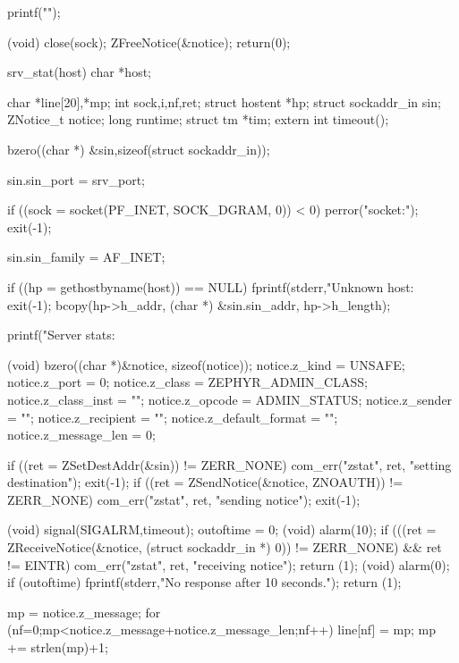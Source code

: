\begin{code}
{        printf("\n");
        
        (void) close(sock);
        ZFreeNotice(&notice);
        return(0);
}

srv_stat(host)
        char *host;
{
        char *line[20],*mp;
        int sock,i,nf,ret;
        struct hostent *hp;
        struct sockaddr_in sin;
        ZNotice_t notice;
        long runtime;
        struct tm *tim;
        extern int timeout();
        
        bzero((char *) &sin,sizeof(struct sockaddr_in));

        sin.sin_port = srv_port;

        if ((sock = socket(PF_INET, SOCK_DGRAM, 0)) < 0) {
                perror("socket:");
                exit(-1);
        }
        
        sin.sin_family = AF_INET;

        if ((hp = gethostbyname(host)) == NULL) {
                fprintf(stderr,"Unknown host: %
                exit(-1);
        }
        bcopy(hp->h_addr, (char *) &sin.sin_addr, hp->h_length);

        printf("Server stats: %
        
        (void) bzero((char *)&notice, sizeof(notice));
        notice.z_kind = UNSAFE;
        notice.z_port = 0;
        notice.z_class = ZEPHYR_ADMIN_CLASS;
        notice.z_class_inst = "";
        notice.z_opcode = ADMIN_STATUS;
        notice.z_sender = "";
        notice.z_recipient = "";
        notice.z_default_format = "";
        notice.z_message_len = 0;
        
        if ((ret = ZSetDestAddr(&sin)) != ZERR_NONE) {
                com_err("zstat", ret, "setting destination");
                exit(-1);
        }
        if ((ret = ZSendNotice(&notice, ZNOAUTH)) != ZERR_NONE) {
                com_err("zstat", ret, "sending notice");
                exit(-1);
        }

        (void) signal(SIGALRM,timeout);
        outoftime = 0;
        (void) alarm(10);
        if (((ret = ZReceiveNotice(&notice, (struct sockaddr_in *) 0))
            != ZERR_NONE) &&
            ret != EINTR) {
                com_err("zstat", ret, "receiving notice");
                return (1);
        }
        (void) alarm(0);
        if (outoftime) {
                fprintf(stderr,"No response after 10 seconds.\n");
                return (1);
        } 
        
        mp = notice.z_message;
        for (nf=0;mp<notice.z_message+notice.z_message_len;nf++) {
                line[nf] = mp;
                mp += strlen(mp)+1;
        }

}
\end{code}
